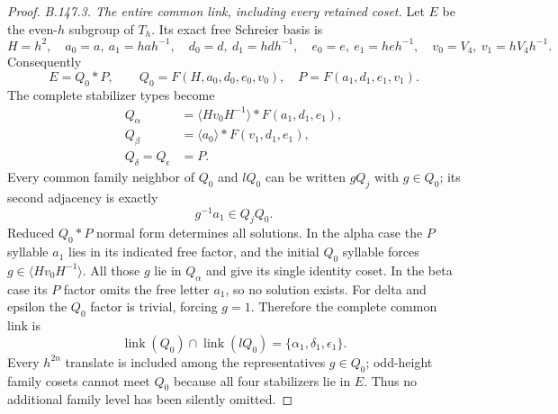 \begin{proof}
\emph{B.147.3. The entire common link, including every retained coset.}
Let $E$ be the even-$h$ subgroup of $T_h$. Its exact free Schreier
basis is
\[
 H=h^2,\quad a_0=a,\ a_1=hah^{-1},\quad
 d_0=d,\ d_1=hdh^{-1},\quad e_0=e,\ e_1=heh^{-1},\quad
 v_0=V_4,\ v_1=hV_4h^{-1}.
\]
Consequently
\begin{equation}\label{eq:B147-free-factors}
 E=Q_0*P,\qquad
 Q_0=F(H,a_0,d_0,e_0,v_0),\quad P=F(a_1,d_1,e_1,v_1).
\end{equation}
The complete stabilizer types become
\begin{equation}\label{eq:B147-stabilizer-products}
\begin{aligned}
 Q_\alpha&=\langle Hv_0H^{-1}\rangle*F(a_1,d_1,e_1),\\
 Q_\beta&=\langle a_0\rangle*F(v_1,d_1,e_1),\\
 Q_\delta=Q_\epsilon&=P.
\end{aligned}
\end{equation}
Every common family neighbor of $Q_0$ and $lQ_0$ can be written
$gQ_j$ with $g\in Q_0$; its second adjacency is exactly
\begin{equation}\label{eq:B147-coset-condition}
 g^{-1}a_1\in Q_jQ_0.
\end{equation}
Reduced $Q_0*P$ normal form determines all solutions. In the
alpha case the $P$ syllable $a_1$ lies in its indicated free
factor, and the initial $Q_0$ syllable forces
$g\in\langle Hv_0H^{-1}\rangle$. All those $g$ lie in
$Q_\alpha$ and give its single identity coset. In the beta case
its $P$ factor omits the free letter $a_1$, so no solution exists.
For delta and epsilon the $Q_0$ factor is trivial, forcing $g=1$.
Therefore the complete common link is
\begin{equation}\label{eq:B147-complete-link}
 \operatorname{link}(Q_0)\cap\operatorname{link}(lQ_0)
                  =\{\alpha_1,\delta_1,\epsilon_1\}.
\end{equation}
Every $h^{2n}$ translate is included among the representatives
$g\in Q_0$; odd-height family cosets cannot meet $Q_0$ because
all four stabilizers lie in $E$. Thus no additional family level
has been silently omitted.


\end{proof}

